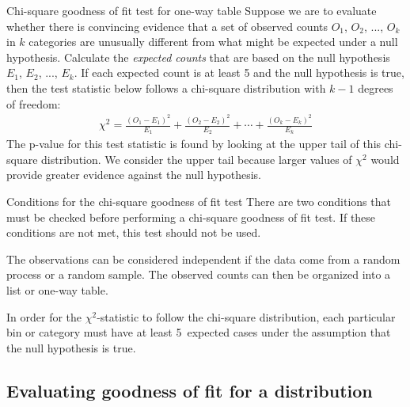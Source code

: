 \begin{onebox}{Chi-square goodness of fit test for one-way table}
Suppose we are to evaluate whether there is convincing evidence that a set of observed counts $O_1$, $O_2$, ..., $O_k$ in $k$ categories are unusually different from what might be expected under a null hypothesis. Calculate the \emph{expected counts} that are based on the null hypothesis $E_1$, $E_2$, ..., $E_k$. If each expected count is at least 5 and the null hypothesis is true, then the test statistic below follows a chi-square distribution with $k-1$ degrees of freedom:
\begin{align*}
\chi^2 = \frac{(O_1 - E_1)^2}{E_1} + \frac{(O_2 - E_2)^2}{E_2} + \cdots + \frac{(O_k - E_k)^2}{E_k}
\end{align*}
The p-value for this test statistic is found by looking at the upper tail of this chi-square distribution. We consider the upper tail because larger values of $\chi^2$ would provide greater evidence against the null hypothesis.\end{onebox}

\begin{onebox}{Conditions for the chi-square goodness of fit test}
There are two conditions that must be checked before performing a chi-square goodness of fit test. If these conditions are not met, this test should not be used.\vspace{-1mm}
\begin{description}
\setlength{\itemsep}{0mm}
\item[Independent.] The observations can be considered independent if the data come from a random process or a random sample.  The observed counts can then be organized into a list or one-way table.
\item[All expected counts at least 5.] In order for the $\chi^2$-statistic to follow the chi-square distribution, each particular bin or category must have at least \mbox{5~expected} cases under the assumption that the null hypothesis is true.
\vspace{-2mm}
\end{description}
\end{onebox}


\subsection{Evaluating goodness of fit for a distribution}


